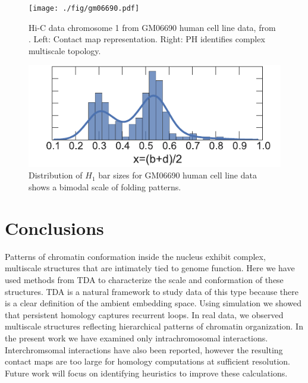 \begin{figure}
       \centering
       \texttt{[image: ./fig/gm06690.pdf]}
       \caption{Hi-C data chromosome 1 from GM06690 human cell line data, from \cite{LiebermanAiden:2009jz}. Left: Contact map representation. Right: PH identifies complex multiscale topology.}
       \label{fig:human_data}
\end{figure}

\begin{figure}
       \centering
       \includegraphics[width=\columnwidth]{./fig/gm06690_barsizes_v2.pdf}
       \caption{Distribution of $H_1$ bar sizes for GM06690 human cell line data shows a bimodal scale of folding patterns.}
       \label{fig:human_data_histogram}
\end{figure}

\section{Conclusions}
\label{sec:conclusions}
%
Patterns of chromatin conformation inside the nucleus exhibit complex, multiscale structures that are intimately tied to genome function.
Here we have used methods from TDA to characterize the scale and conformation of these structures.
TDA is a natural framework to study data of this type because there is a clear definition of the ambient embedding space.
Using simulation we showed that persistent homology captures recurrent loops.
In real data, we observed multiscale structures reflecting hierarchical patterns of chromatin organization.
In the present work we have examined only intrachromosomal interactions.
Interchromsomal interactions have also been reported, however the resulting contact maps are too large for homology computations at sufficient resolution.
Future work will focus on identifying heuristics to improve these calculations.